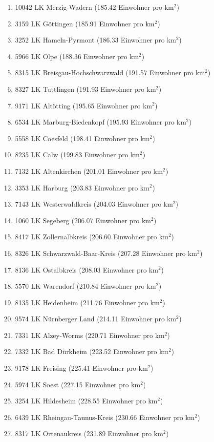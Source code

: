 \begin{enumerate}[itemsep=-6mm]
\item 10042 LK Merzig-Wadern (185.42 Einwohner pro km$^2$)
\item 3159 LK Göttingen (185.91 Einwohner pro km$^2$)
\item 3252 LK Hameln-Pyrmont (186.33 Einwohner pro km$^2$)
\item 5966 LK Olpe (188.36 Einwohner pro km$^2$)
\item 8315 LK Breisgau-Hochschwarzwald (191.57 Einwohner pro km$^2$)
\item 8327 LK Tuttlingen (191.93 Einwohner pro km$^2$)
\item 9171 LK Altötting (195.65 Einwohner pro km$^2$)
\item 6534 LK Marburg-Biedenkopf (195.93 Einwohner pro km$^2$)
\item 5558 LK Coesfeld (198.41 Einwohner pro km$^2$)
\item 8235 LK Calw (199.83 Einwohner pro km$^2$)
\item 7132 LK Altenkirchen (201.01 Einwohner pro km$^2$)
\item 3353 LK Harburg (203.83 Einwohner pro km$^2$)
\item 7143 LK Westerwaldkreis (204.03 Einwohner pro km$^2$)
\item 1060 LK Segeberg (206.07 Einwohner pro km$^2$)
\item 8417 LK Zollernalbkreis (206.60 Einwohner pro km$^2$)
\item 8326 LK Schwarzwald-Baar-Kreis (207.28 Einwohner pro km$^2$)
\item 8136 LK Ostalbkreis (208.03 Einwohner pro km$^2$)
\item 5570 LK Warendorf (210.84 Einwohner pro km$^2$)
\item 8135 LK Heidenheim (211.76 Einwohner pro km$^2$)
\item 9574 LK Nürnberger Land (214.11 Einwohner pro km$^2$)
\item 7331 LK Alzey-Worms (220.71 Einwohner pro km$^2$)
\item 7332 LK Bad Dürkheim (223.52 Einwohner pro km$^2$)
\item 9178 LK Freising (225.41 Einwohner pro km$^2$)
\item 5974 LK Soest (227.15 Einwohner pro km$^2$)
\item 3254 LK Hildesheim (228.55 Einwohner pro km$^2$)
\item 6439 LK Rheingau-Taunus-Kreis (230.66 Einwohner pro km$^2$)
\item 8317 LK Ortenaukreis (231.89 Einwohner pro km$^2$)

\end{enumerate}
